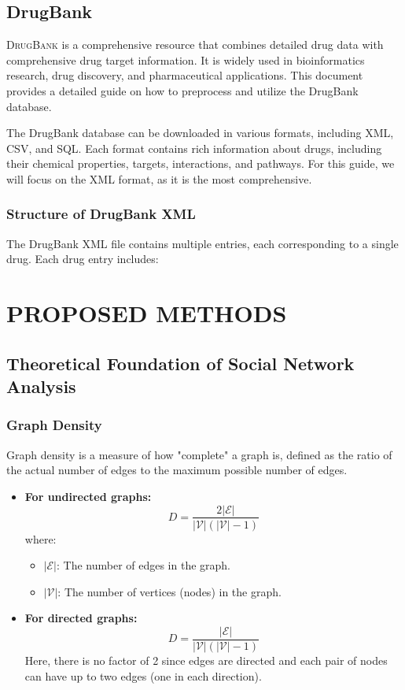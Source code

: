 \documentclass[12pt, a4paper,oneside]{book}
\begin{document}
\section{DrugBank}
\lettrine[lines=3, slope=0.6em, lhang=0.0, nindent=3pt]{D}{rugBank}  is a comprehensive resource that combines detailed drug data with comprehensive drug target information. It is widely used in bioinformatics research, drug discovery, and pharmaceutical applications. This document provides a detailed guide on how to preprocess and utilize the DrugBank database.

The DrugBank database can be downloaded in various formats, including XML, CSV, and SQL. Each format contains rich information about drugs, including their chemical properties, targets, interactions, and pathways. For this guide, we will focus on the XML format, as it is the most comprehensive.

\subsection{Structure of DrugBank XML}

The DrugBank XML file contains multiple entries, each corresponding to a single drug. Each drug entry includes:



\chapter{\selectfont PROPOSED METHODS}
\section{Theoretical Foundation of Social Network Analysis}

\subsection{Graph Density}
Graph density is a measure of how "complete" a graph is, defined as the ratio of the actual number of edges to the maximum possible number of edges.

\begin{itemize}
    \item \textbf{For undirected graphs:}
    \[
    D = \frac{2|\mathcal{E}|}{|\mathcal{V}|(|\mathcal{V}| - 1)}
    \]
    where:
    \begin{itemize}
        \item \( |\mathcal{E}| \): The number of edges in the graph.
        \item \( |\mathcal{V}| \): The number of vertices (nodes) in the graph.
    \end{itemize}

    \item \textbf{For directed graphs:}
    \[
    D = \frac{|\mathcal{E}|}{|\mathcal{V}|(|\mathcal{V}| - 1)}
    \]
    Here, there is no factor of 2 since edges are directed and each pair of nodes can have up to two edges (one in each direction).
\end{itemize}
\end{document}
